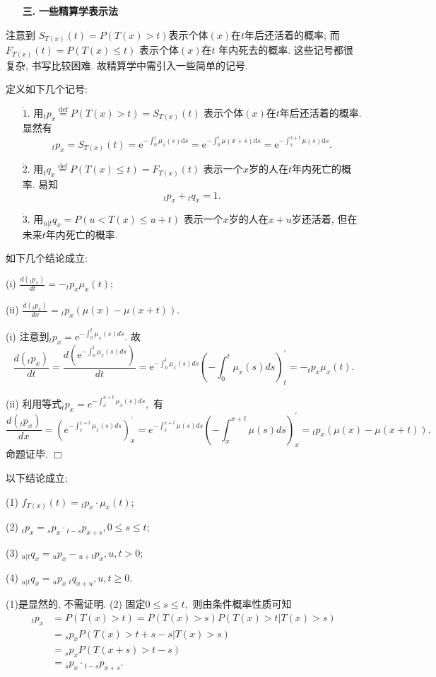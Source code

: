 \documentclass[a4paper,openany, 10pt]{ctexbook}
\newcommand{\hei}{\CJKfamily{hei}}      %
\def\qed{\hfill$\Box$\medskip}
\def\z{\left}
\def\y{\right}
\begin{document}
\begin{itemize}
    \item[{\bf\hei 三.}]{\bf\hei 一些精算学表示法}
\end{itemize}
注意到 $ S_{T(x)}(t)=P(T(x)>t)$表示个体$ (x)$在$t$年后还活着的概率; 而$F_{T(x)}(t)=P(T(x)\le t)$ 表示个体$(x)$在$t$ 年内死去的概率. 这些记号都很复杂, 书写比较困难. 故精算学中需引入一些简单的记号.


定义如下几个记号:
\begin{enumerate}
    \item[$\mathring 1.$] 用$_tp_{x}\stackrel{\text{def}}{=}P(T(x)>t)=S_{T(x)}(t)$
        表示个体$(x)$在$t$年后还活着的概率. 显然有
        $$ {}_tp_x=S_{T(x)}(t)=\mathrm{e}^{-\int_{0}^{t}\mu_x(s)\mathrm{d}s}=\mathrm{e}^{-\int_{0}^{t}\mu(x+s)\mathrm{d}s}=\mathrm{e}^{-\int_{x}^{x+t}\mu(s)\mathrm{d}s}.$$
    \item[$\mathring 2.$] 用$_tq_{x}\stackrel{\text{def}}{=}P(T(x)\leq t)=F_{T(x)}(t)$
        表示一个$x$岁的人在$t$年内死亡的概率. 易知
        $$_tp_{x}+{}_tq_{x}=1.$$
    \item[$\mathring 3.$] 用$ _{u|t}q_x=P(u<T(x)\leq u+t)$
        表示一个$x$岁的人在$x+u$岁还活着, 但在未来$t$年内死亡的概率.
\end{enumerate}
\begin{proposition}如下几个结论成立:

    (i) $\frac{d(_tp_x)}{dt}=-_tp_x\mu_x(t);$

    (ii) $\frac{d(_tp_x)}{dx}= {}_tp_x(\mu(x)-\mu(x+t)).$


\end{proposition}

\proof (i) 注意到${}_tp_x=\mathrm{e}^{-\int_{0}^{t}\mu_x(s)ds}.$ 故
$$\frac{d(_tp_x)}{dt}=\frac{d(\mathrm{e}^{-\int_{0}^{t}\mu_x(s)ds})}{dt}=\mathrm{e}^{-\int_{0}^{t}\mu_x(s)ds}\z({-\int_{0}^{t}\mu_x(s)ds}\y)^{\prime}_t=-_tp_x\mu_x(t).$$

(ii) 利用等式${}_tp_x=e^{-\int_{x}^{x+t}\mu_x(s)ds},$ 有
$$\frac{d(_tp_x)}{dx}=\z(e^{-\int_{x}^{x+t}\mu_x(s)ds}\y)^{\prime}_x=e^{-\int_{x}^{x+t}\mu(s)ds}\z({-\int_{x}^{x+t}\mu(s)ds}\y)^{\prime}_x= {}_tp_x(\mu(x)-\mu(x+t)).$$
命题证毕.
\qed

\begin{proposition}以下结论成立:

    (1) $f_{T(x)}(t)={}_tp_x\cdot \mu_x(t);$

    (2) $_tp_x={}_sp_x\cdot{}_{t-s}p_{x+s},0\leq s\leq t;$

    (3) ${}_{u|t}q_x={}_up_x-{}_{u+t}p_x, u,t>0;$

    (4) ${}_{u|t}q_x={}_up_x~{}_{t}q_{x+u},u,t\ge0.$
\end{proposition}
\proof (1)是显然的, 不需证明. (2)
固定$0\le s\le t,$ 则由条件概率性质可知
\begin{align*}
    {}_tp_x & =P(T(x)>t)=P(T(x)>s)P(T(x)>t|T(x)>s) \\
            & ={}_sp_xP(T(x)>t+s-s|T(x)>s)         \\
            & ={}_sp_xP(T(x+s)>t-s)                \\
            & ={}_sp_x\cdot{}_{t-s}p_{x+s}.\end{align*}
\end{document}
